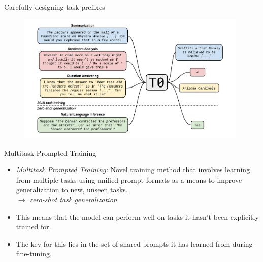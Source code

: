 \begin{frame}{Carefully designing task prefixes}

\vfill
	
	\begin{figure}
		\centering
		\includegraphics[width = 11cm]{figure/81-t0.png}\\ 
	\end{figure}

\vfill

\end{frame}


\begin{frame}{Multitask Prompted Training}

\vfill

\begin{itemize}
    \item \textit{Multitask Prompted Training:} Novel training method that involves learning from multiple tasks using unified prompt formats as a means to improve generalization to new, unseen tasks. \\ $\to$ \textit{zero-shot task generalization}
    \item This means that the model can perform well on tasks it hasn't been explicitly trained for.
    \item The key for this lies in the set of shared prompts it has learned from during fine-tuning.
\end{itemize}

\vfill

\end{frame}


